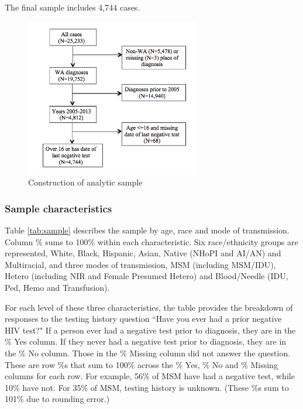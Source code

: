 \documentclass{article}\usepackage[]{graphicx}\usepackage[]{color}
\begin{document}
The final sample includes 4,744 cases.

    
\begin{figure}[!h]
  \centering
    \includegraphics[width=3in]{exclusion_diagram}
    \caption{Construction of analytic sample}
    \label{fig:exclusion}
\end{figure}

\subsubsection{Sample characteristics}

Table \ref{tab:sample} describes the sample by age, race and mode of transmission. Column \% sums to 100\% within each characteristic. Six race/ethnicity groups are represented, White, Black, Hispanic, Asian, Native (NHoPI and AI/AN) and Multiracial, and three modes of transmission, MSM (including MSM/IDU), Hetero (including NIR and Female Presumed Hetero) and Blood/Needle (IDU, Ped, Hemo and Transfusion). 

For each level of these three characteristics, the table provides the breakdown of responses to the testing history question ``Have you ever had a prior negative HIV test?"  If a person ever had a negative test prior to diagnosis, they are in the \% Yes column. If they never had a negative test prior to diagnosis, they are in the \% No column. Those in the \% Missing column did not answer the question. These are row \%s that sum to 100\% across the \% Yes, \% No and \% Missing columns for each row. For example, 56\% of MSM have had a negative test, while 10\% have not. For 35\% of MSM, testing history is unknown. (These \%s sum to 101\% due to rounding error.) 
\end{document}
